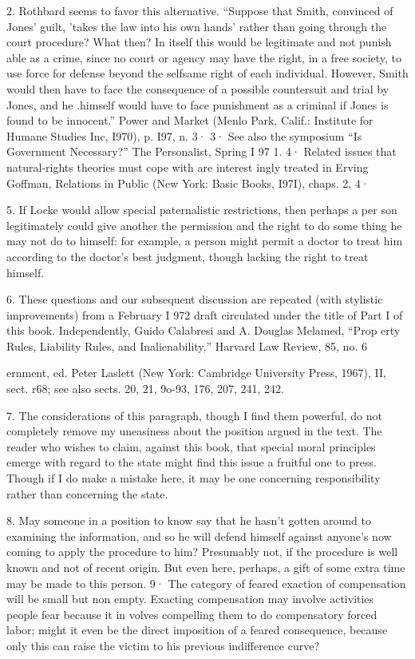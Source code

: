 \documentclass[11pt,openany]{book}
\begin{document}
{2. Rothbard seems to favor this alternative. ``Suppose that Smith, convinced of Jones' guilt, 'takes the law into his own hands' rather than going through the court procedure? What then? In itself this would be legitimate and not punish able as a crime, since no court or agency may have the right, in a free society, to use force for defense beyond the selfsame right of each individual. However, Smith would then have to face the consequence of a possible countersuit and trial by Jones, and he .himself would have to face punishment as a criminal if Jones is found to be innocent.'' Power and Market (Menlo Park, Calif.: Institute for Humane Studies Inc, I970), p. I97, n. 3· 3· See also the symposium ``Is Government Necessary?'' The Personalist, Spring I 97 1. 4· Related issues that natural-rights theories must cope with are interest ingly treated in Erving Goffman, Relations in Public (New York: Basic Books, I97I), chaps. 2, 4·\par

5. If Locke would allow special paternalistic restrictions, then perhaps a per son legitimately could give another the permission and the right to do some thing he may not do to himself: for example, a person might permit a doctor to treat him according to the doctor's best judgment, though lacking the right to treat himself.\par

6. These questions and our subsequent discussion are repeated (with stylistic improvements) from a February I 972 draft circulated under the title of Part I of this book. Independently, Guido Calabresi and A. Douglas Melamed, ``Prop erty Rules, Liability Rules, and Inalienability,'' Harvard Law Review, 85, no. 6\par

ernment, ed. Peter Laslett (New York: Cambridge University Press, 1967), II, sect. r68; see also sects. 20, 21, 9o-93, 176, 207, 241, 242.\par

7. The considerations of this paragraph, though I find them powerful, do not completely remove my uneasiness about the position argued in the text. The reader who wishes to claim, against this book, that special moral principles emerge with regard to the state might find this issue a fruitful one to press. Though if I do make a mistake here, it may be one concerning responsibility rather than concerning the state.\par

8. May someone in a position to know say that he hasn't gotten around to examining the information, and so he will defend himself against anyone's now coming to apply the procedure to him? Presumably not, if the procedure is well known and not of recent origin. But even here, perhaps, a gift of some extra time may be made to this person. 9· The category of feared exaction of compensation will be small but non empty. Exacting compensation may involve activities people fear because it in volves compelling them to do compensatory forced labor; might it even be the direct imposition of a feared consequence, because only this can raise the victim to his previous indifference curve?\par

}
\end{document}
